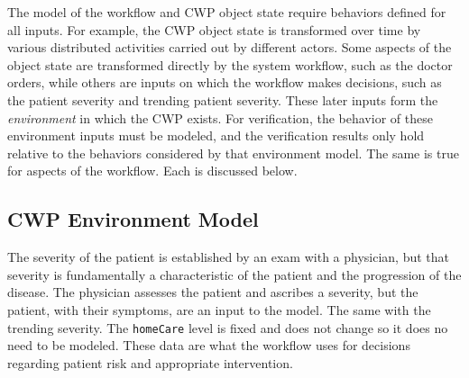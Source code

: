 The model of the workflow and CWP object state require behaviors defined for all inputs.
For example, the CWP object state is transformed over time by various distributed activities carried out by different actors.
Some aspects of the object state are transformed directly by the system workflow, such as the doctor orders, while others are inputs on which the workflow makes decisions, such as the patient severity and trending patient severity. These later inputs form the \emph{environment} in which the CWP exists.
For verification, the behavior of these environment inputs must be modeled, and the verification results only hold relative to the behaviors considered by that environment model.
The same is true for aspects of the workflow. Each is discussed below.

\subsection{CWP Environment Model}
The severity of the patient is established by an exam with a physician, but that severity is fundamentally a characteristic of the patient and the progression of the disease.
The physician assesses the patient and ascribes a severity, but the patient, with their symptoms, are an input to the model.
The same with the trending severity. The \texttt{homeCare} level is fixed and does not change so it does no need to be modeled.
These data are what the workflow uses for decisions regarding patient risk and appropriate intervention. 

\begin{comment}
There is, of course, a causal relationship between the decisions in a workflow and the resulting subsequent input.
For example, it is normally expected that when a doctor orders a patient admitted to the hospital that at some point in the future the severity rating for the patient diminishes due to the increased level of intervention and care.
Here is where modeling choices can limit the impact, and meaning, of any verification results as the verification only hold for the modeled input behavior.

The intent is to create the weakest (e.g., the least restrictive) environment model possible in which a workflow is able to be verified.
That means the environment model includes behavior that exists in the real world, and it includes behaviors that do not exist in the real world resulting in a \emph{sound over-approximation} of feasible environment behavior.
If a workflow verifies in the sound over-approximated environment, then by implication, that verification result holds in the real world since those behaviors are a subset of the ones considered for verification.
\end{comment}

